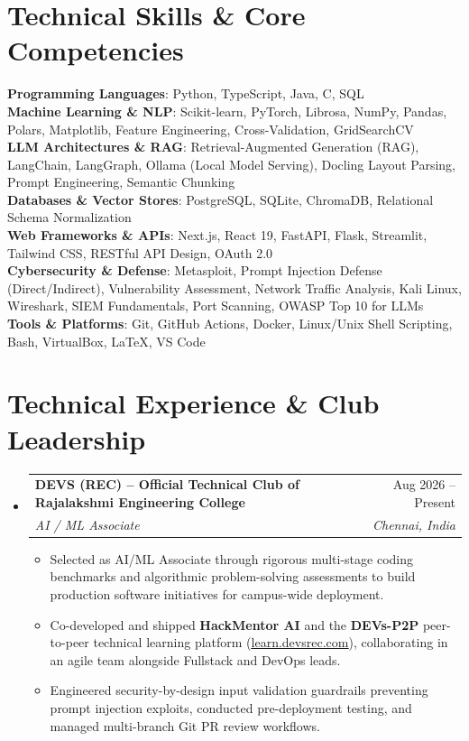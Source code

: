 \documentclass[letterpaper,10pt]{article}
\makeatletter
\newcommand{\resumeItem}[1]{\item\small{#1 \vspace{-2pt}}}
\newcommand{\resumeSubheading}[4]{
  \vspace{-2pt}\item
    \begin{tabular*}{0.98\textwidth}[t]{l@{\extracolsep{\fill}}r}
      \textbf{#1} & #2 \\
      \textit{\small#3} & \textit{\small #4} \\
    \end{tabular*}\vspace{-5pt}
}
\newcommand{\resumeSubHeadingListStart}{\begin{itemize}[leftmargin=0.15in, label={}]}
\newcommand{\resumeSubHeadingListEnd}{\end{itemize}}
\newcommand{\resumeItemListStart}{\begin{itemize}}
\newcommand{\resumeItemListEnd}{\end{itemize}\vspace{-4pt}}
\makeatother
\begin{document}
\section{Technical Skills \& Core Competencies}
\begin{itemize}[leftmargin=0.15in, label={}]
  \small{\item{
    \textbf{Programming Languages}{: Python, TypeScript, Java, C, SQL} \\
    \textbf{Machine Learning \& NLP}{: Scikit-learn, PyTorch, Librosa, NumPy, Pandas, Polars, Matplotlib, Feature Engineering, Cross-Validation, GridSearchCV} \\
    \textbf{LLM Architectures \& RAG}{: Retrieval-Augmented Generation (RAG), LangChain, LangGraph, Ollama (Local Model Serving), Docling Layout Parsing, Prompt Engineering, Semantic Chunking} \\
    \textbf{Databases \& Vector Stores}{: PostgreSQL, SQLite, ChromaDB, Relational Schema Normalization} \\
    \textbf{Web Frameworks \& APIs}{: Next.js, React 19, FastAPI, Flask, Streamlit, Tailwind CSS, RESTful API Design, OAuth 2.0} \\
    \textbf{Cybersecurity \& Defense}{: Metasploit, Prompt Injection Defense (Direct/Indirect), Vulnerability Assessment, Network Traffic Analysis, Kali Linux, Wireshark, SIEM Fundamentals, Port Scanning, OWASP Top 10 for LLMs} \\
    \textbf{Tools \& Platforms}{: Git, GitHub Actions, Docker, Linux/Unix Shell Scripting, Bash, VirtualBox, LaTeX, VS Code}
  }}
\end{itemize}

\section{Technical Experience \& Club Leadership}
  \resumeSubHeadingListStart
    \resumeSubheading
      {DEVS (REC) -- Official Technical Club of Rajalakshmi Engineering College}{Aug 2026 -- Present}
      {AI / ML Associate}{Chennai, India}
      \resumeItemListStart
        \resumeItem{Selected as AI/ML Associate through rigorous multi-stage coding benchmarks and algorithmic problem-solving assessments to build production software initiatives for campus-wide deployment.}
        \resumeItem{Co-developed and shipped \textbf{HackMentor AI} and the \textbf{DEVs-P2P} peer-to-peer technical learning platform (\href{https://learn.devsrec.com/}{\underline{learn.devsrec.com}}), collaborating in an agile team alongside Fullstack and DevOps leads.}
        \resumeItem{Engineered security-by-design input validation guardrails preventing prompt injection exploits, conducted pre-deployment testing, and managed multi-branch Git PR review workflows.}
      \resumeItemListEnd
  \resumeSubHeadingListEnd
\end{document}
